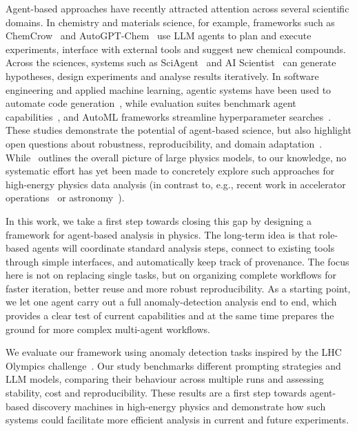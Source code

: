 \documentclass[submission, Phys]{SciPost}
\begin{document}
Agent-based approaches have recently attracted attention across several scientific domains. In chemistry and materials science, for example, frameworks such as ChemCrow~\cite{Bran2024ChemCrow} and AutoGPT-Chem~\cite{Boiko2023Coscientist} use LLM agents to plan and execute experiments, interface with external tools and suggest new chemical compounds. Across the sciences, systems such as SciAgent~\cite{Ma2024SciAgent} and AI Scientist~\cite{Lu2024AIScientist,Yamada2025AIScientistV2} can generate hypotheses, design experiments and analyse results iteratively. In software engineering and applied machine learning, agentic systems have been used to automate code generation~\cite{yang2024swe,OpenDevin2024}, while evaluation suites benchmark agent capabilities~\cite{liu2023agentbench,liang2023holistic}, and AutoML frameworks streamline hyperparameter searches~\cite{10.1145/3292500.3330701}. These studies demonstrate the potential of agent-based science, but also highlight open questions about robustness, reproducibility, and domain adaptation~\cite{Eger2025Survey,Ren2025SciAgentsSurvey}. 
While~\cite{Barman:2025wfb} outlines the overall picture of
large physics models, to our knowledge, no systematic effort has yet been made to concretely explore such approaches for high-energy physics data analysis (in contrast to, e.g., recent work in accelerator operations~\cite{Kaiser2025SciAdv} or astronomy~\cite{kostunin2025aiagentsgroundbasedgamma}).


In this work, we take a first step towards closing this gap by designing a framework for agent-based analysis in physics. The long-term idea is that role-based agents will coordinate standard analysis steps, connect to existing tools through simple interfaces, and automatically keep track of provenance. The focus here is not on replacing single tasks, but on organizing complete workflows for faster iteration, better reuse and more robust reproducibility.
As a starting point, we let one agent carry out a full anomaly-detection analysis end to end, which provides a clear test of current capabilities and at the same time prepares the ground for more complex multi-agent workflows.


We evaluate our framework using anomaly detection tasks inspired by the LHC Olympics challenge~\cite{Kasieczka:2021xcg}. Our study benchmarks different prompting strategies and LLM models, comparing their behaviour across multiple runs and assessing stability, cost and reproducibility. These results are a first step towards agent-based discovery machines in high-energy physics and demonstrate how such systems could facilitate more efficient analysis in current and future experiments.
\end{document}
